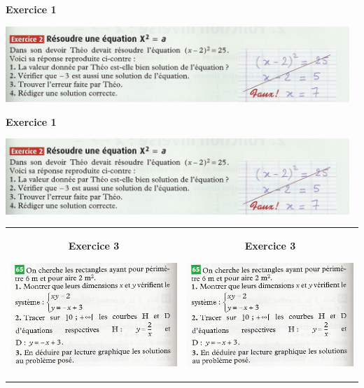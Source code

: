 \documentclass[12pt, twoside]{article}
\begin{document}
\textbf{Exercice 1}

\enskip

\includegraphics[width=13cm]{images/theo.png}



\medskip

\textbf{Exercice 1}

\enskip

\includegraphics[width=13cm]{images/theo.png}



\medskip

\begin{tabular}{cc}
\begin{minipage}{9cm}
\textbf{Exercice 3}

\enskip

\includegraphics[width=7cm]{images/ineq2.png}
\end{minipage}
&
\begin{minipage}{9cm}
\textbf{Exercice 3}

\enskip

\includegraphics[width=7cm]{images/ineq2.png}
\end{minipage}
\end{tabular}
\end{document}
